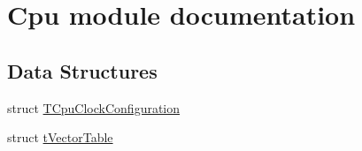 \hypertarget{group___cpu__module}{\section{Cpu module documentation}
\label{group___cpu__module}
}
\subsection*{Data Structures}
\begin{DoxyCompactItemize}
\item 
struct \hyperlink{struct_t_cpu_clock_configuration}{T\-Cpu\-Clock\-Configuration}
\item 
struct \hyperlink{structt_vector_table}{t\-Vector\-Table}
\end{DoxyCompactItemize}
